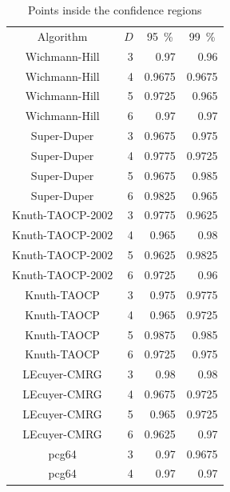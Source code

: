 \begin{table}[H]
	\centering
	\caption{Points inside the confidence regions}
	\label{tab:resultFinal}
	\begin{tabular}{c*{3}r}
		\toprule
		Algorithm & \multicolumn{1}{c}{$D$} & \multicolumn{1}{c}{\SI{95}{\percent}} & \multicolumn{1}{c}{\SI{99}{\percent}}\\
		\cmidrule(lr){1-1}
		\cmidrule(lr){2-2}
		\cmidrule(lr){3-3}
		\cmidrule(lr){4-4}
		Wichmann-Hill & 3 & 0.97 & 0.96\\ 
		Wichmann-Hill & 4 & 0.9675 & 0.9675\\ 
		Wichmann-Hill & 5 & 0.9725 & 0.965\\ 
		Wichmann-Hill & 6 & 0.97 & 0.97\\ 
		\cmidrule(lr){1-4}
		Super-Duper & 3 & 0.9675 & 0.975\\ 
		Super-Duper & 4 & 0.9775 & 0.9725\\ 
		Super-Duper & 5 & 0.9675 & 0.985\\ 
		Super-Duper & 6 & 0.9825 & 0.965\\ 
		\cmidrule(lr){1-4}
		Knuth-TAOCP-2002 & 3 & 0.9775 & 0.9625\\ 
		Knuth-TAOCP-2002 & 4 & 0.965 & 0.98\\ 
		Knuth-TAOCP-2002 & 5 & 0.9625 & 0.9825\\ 
		Knuth-TAOCP-2002 & 6 & 0.9725 & 0.96\\  
		\cmidrule(lr){1-4}
		Knuth-TAOCP & 3 & 0.975 & 0.9775\\ 
		Knuth-TAOCP & 4 & 0.965 & 0.9725\\ 
		Knuth-TAOCP & 5 & 0.9875 & 0.985\\ 
		Knuth-TAOCP & 6 & 0.9725 & 0.975\\ 
		\cmidrule(lr){1-4}
		LEcuyer-CMRG & 3 & 0.98 & 0.98\\ 
		LEcuyer-CMRG & 4 & 0.9675 & 0.9725\\ 
		LEcuyer-CMRG & 5 & 0.965 & 0.9725\\ 
		LEcuyer-CMRG & 6 & 0.9625 & 0.97\\ 
		\cmidrule(lr){1-4}
		pcg64 & 3 & 0.97 & 0.9675\\ 
		pcg64 & 4 & 0.97 & 0.97\\ 

\end{tabular}
\end{table}
